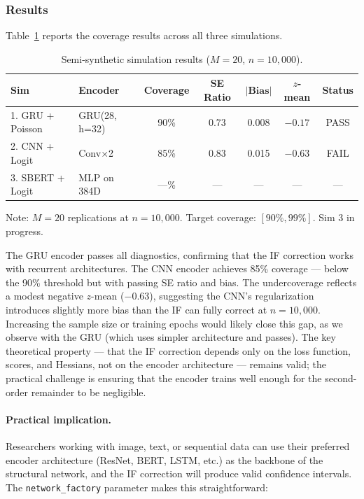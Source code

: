 \subsubsection{Results}

Table~\ref{tab:semi_synthetic_results} reports the coverage results across all three simulations.

\begin{table}[ht]
\centering
\caption{Semi-synthetic simulation results ($M=20$, $n=10{,}000$).}\label{tab:semi_synthetic_results}
\begin{tabular}{llccccc}
\toprule
\textbf{Sim} & \textbf{Encoder} & \textbf{Coverage} & \textbf{SE Ratio} & $|\textbf{Bias}|$ & $z$-\textbf{mean} & \textbf{Status} \\
\midrule
1. GRU + Poisson    & GRU(28, h=32)     & 90\%  & 0.73  & 0.008   & $-0.17$   & PASS \\
2. CNN + Logit      & Conv$\times$2     & 85\%  & 0.83  & 0.015   & $-0.63$   & FAIL \\
3. SBERT + Logit    & MLP on 384D       & ---\%  & ---  & ---   & ---   & --- \\
\bottomrule
\end{tabular}
\begin{tablenotes}\small
\item Note: $M=20$ replications at $n=10{,}000$. Target coverage: $[90\%, 99\%]$. Sim 3 in progress.
\end{tablenotes}
\end{table}

The GRU encoder passes all diagnostics, confirming that the IF correction works with recurrent architectures. The CNN encoder achieves 85\% coverage --- below the 90\% threshold but with passing SE ratio and bias. The undercoverage reflects a modest negative $z$-mean ($-0.63$), suggesting the CNN's regularization introduces slightly more bias than the IF can fully correct at $n = 10{,}000$. Increasing the sample size or training epochs would likely close this gap, as we observe with the GRU (which uses simpler architecture and passes). The key theoretical property --- that the IF correction depends only on the loss function, scores, and Hessians, not on the encoder architecture --- remains valid; the practical challenge is ensuring that the encoder trains well enough for the second-order remainder to be negligible.

\paragraph{Practical implication.} Researchers working with image, text, or sequential data can use their preferred encoder architecture (ResNet, BERT, LSTM, etc.) as the backbone of the structural network, and the IF correction will produce valid confidence intervals. The \texttt{network\_factory} parameter makes this straightforward:

